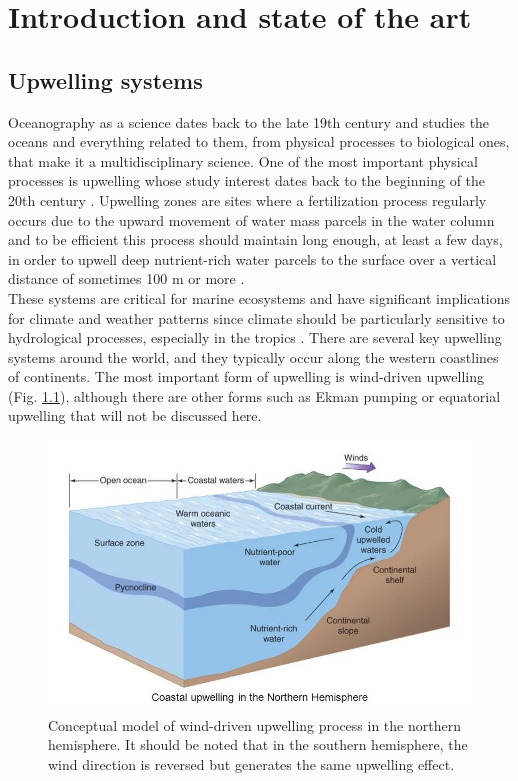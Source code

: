 \chapter{Introduction and state of the art}\label{Chap1}

\section{Upwelling systems}\label{Chap1UpweSyst}

Oceanography as a science dates back to the late 19th century \citep{Wust1964,Mill2012,LlopCowe2014} and studies the oceans and everything related to them, from physical processes to biological ones, that make it a multidisciplinary science. One of the most important physical processes is upwelling whose study interest dates back to the beginning of the 20th century \citep{Ogil1912,Murp1920}. Upwelling zones are sites where a fertilization process regularly occurs due to the upward movement of water mass parcels in the water column and to be efficient this process should maintain long enough, at least a few days, in order to upwell deep nutrient-rich water parcels to the surface over a vertical distance of sometimes 100 m or more \citep{Marg1978}.\\

These systems are critical for marine ecosystems and have significant implications for climate and weather patterns since climate should be particularly sensitive to hydrological processes, especially in the tropics \citep{Webs1994}. There are several key upwelling systems around the world, and they typically occur along the western coastlines of continents. The most important form of upwelling is wind-driven upwelling (Fig. \ref{Chap1CoastalUpwelling}), although there are other forms such as Ekman pumping or equatorial upwelling that will not be discussed here.\\

\begin{figure}[ht]
	\centering
	\includegraphics[width=1.0\textwidth]{figures/Chap1CoastalUpwelling.png}
	\caption{Conceptual model of wind-driven upwelling process in the northern hemisphere. It should be noted that in the southern hemisphere, the wind direction is reversed but generates the same upwelling effect.}
	\label{Chap1CoastalUpwelling}
\end{figure}

